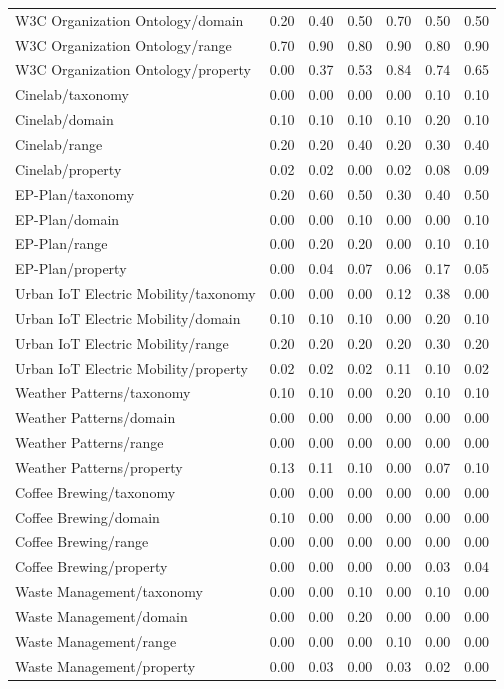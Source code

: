 \begin{tabular}{lcccccc}
W3C Organization Ontology/domain & 0.20 & 0.40 & 0.50 & 0.70 & 0.50 & 0.50 \\
W3C Organization Ontology/range & 0.70 & 0.90 & 0.80 & 0.90 & 0.80 & 0.90 \\
W3C Organization Ontology/property & 0.00 & 0.37 & 0.53 & 0.84 & 0.74 & 0.65 \\
Cinelab/taxonomy & 0.00 & 0.00 & 0.00 & 0.00 & 0.10 & 0.10 \\
Cinelab/domain & 0.10 & 0.10 & 0.10 & 0.10 & 0.20 & 0.10 \\
Cinelab/range & 0.20 & 0.20 & 0.40 & 0.20 & 0.30 & 0.40 \\
Cinelab/property & 0.02 & 0.02 & 0.00 & 0.02 & 0.08 & 0.09 \\
EP-Plan/taxonomy & 0.20 & 0.60 & 0.50 & 0.30 & 0.40 & 0.50 \\
EP-Plan/domain & 0.00 & 0.00 & 0.10 & 0.00 & 0.00 & 0.10 \\
EP-Plan/range & 0.00 & 0.20 & 0.20 & 0.00 & 0.10 & 0.10 \\
EP-Plan/property & 0.00 & 0.04 & 0.07 & 0.06 & 0.17 & 0.05 \\
Urban IoT Electric Mobility/taxonomy & 0.00 & 0.00 & 0.00 & 0.12 & 0.38 & 0.00 \\
Urban IoT Electric Mobility/domain & 0.10 & 0.10 & 0.10 & 0.00 & 0.20 & 0.10 \\
Urban IoT Electric Mobility/range & 0.20 & 0.20 & 0.20 & 0.20 & 0.30 & 0.20 \\
Urban IoT Electric Mobility/property & 0.02 & 0.02 & 0.02 & 0.11 & 0.10 & 0.02 \\
Weather Patterns/taxonomy & 0.10 & 0.10 & 0.00 & 0.20 & 0.10 & 0.10 \\
Weather Patterns/domain & 0.00 & 0.00 & 0.00 & 0.00 & 0.00 & 0.00 \\
Weather Patterns/range & 0.00 & 0.00 & 0.00 & 0.00 & 0.00 & 0.00 \\
Weather Patterns/property & 0.13 & 0.11 & 0.10 & 0.00 & 0.07 & 0.10 \\
Coffee Brewing/taxonomy & 0.00 & 0.00 & 0.00 & 0.00 & 0.00 & 0.00 \\
Coffee Brewing/domain & 0.10 & 0.00 & 0.00 & 0.00 & 0.00 & 0.00 \\
Coffee Brewing/range & 0.00 & 0.00 & 0.00 & 0.00 & 0.00 & 0.00 \\
Coffee Brewing/property & 0.00 & 0.00 & 0.00 & 0.00 & 0.03 & 0.04 \\
Waste Management/taxonomy & 0.00 & 0.00 & 0.10 & 0.00 & 0.10 & 0.00 \\
Waste Management/domain & 0.00 & 0.00 & 0.20 & 0.00 & 0.00 & 0.00 \\
Waste Management/range & 0.00 & 0.00 & 0.00 & 0.10 & 0.00 & 0.00 \\
Waste Management/property & 0.00 & 0.03 & 0.00 & 0.03 & 0.02 & 0.00 \\
\bottomrule
\end{tabular}
